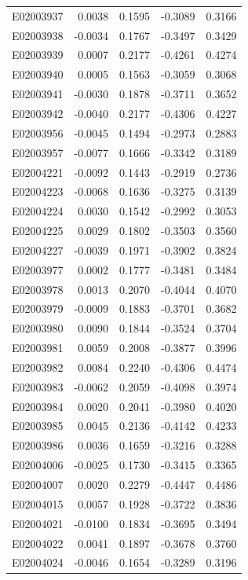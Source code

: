 \documentclass[11pt, a4paper]{article}
\begin{document}
\begin{longtable}{lrrrr}
E02003937 & 0.0038 & 0.1595 & -0.3089 & 0.3166 \\
E02003938 & -0.0034 & 0.1767 & -0.3497 & 0.3429 \\
E02003939 & 0.0007 & 0.2177 & -0.4261 & 0.4274 \\
E02003940 & 0.0005 & 0.1563 & -0.3059 & 0.3068 \\
E02003941 & -0.0030 & 0.1878 & -0.3711 & 0.3652 \\
E02003942 & -0.0040 & 0.2177 & -0.4306 & 0.4227 \\
E02003956 & -0.0045 & 0.1494 & -0.2973 & 0.2883 \\
E02003957 & -0.0077 & 0.1666 & -0.3342 & 0.3189 \\
E02004221 & -0.0092 & 0.1443 & -0.2919 & 0.2736 \\
E02004223 & -0.0068 & 0.1636 & -0.3275 & 0.3139 \\
E02004224 & 0.0030 & 0.1542 & -0.2992 & 0.3053 \\
E02004225 & 0.0029 & 0.1802 & -0.3503 & 0.3560 \\
E02004227 & -0.0039 & 0.1971 & -0.3902 & 0.3824 \\
E02003977 & 0.0002 & 0.1777 & -0.3481 & 0.3484 \\
E02003978 & 0.0013 & 0.2070 & -0.4044 & 0.4070 \\
E02003979 & -0.0009 & 0.1883 & -0.3701 & 0.3682 \\
E02003980 & 0.0090 & 0.1844 & -0.3524 & 0.3704 \\
E02003981 & 0.0059 & 0.2008 & -0.3877 & 0.3996 \\
E02003982 & 0.0084 & 0.2240 & -0.4306 & 0.4474 \\
E02003983 & -0.0062 & 0.2059 & -0.4098 & 0.3974 \\
E02003984 & 0.0020 & 0.2041 & -0.3980 & 0.4020 \\
E02003985 & 0.0045 & 0.2136 & -0.4142 & 0.4233 \\
E02003986 & 0.0036 & 0.1659 & -0.3216 & 0.3288 \\
E02004006 & -0.0025 & 0.1730 & -0.3415 & 0.3365 \\
E02004007 & 0.0020 & 0.2279 & -0.4447 & 0.4486 \\
E02004015 & 0.0057 & 0.1928 & -0.3722 & 0.3836 \\
E02004021 & -0.0100 & 0.1834 & -0.3695 & 0.3494 \\
E02004022 & 0.0041 & 0.1897 & -0.3678 & 0.3760 \\
E02004024 & -0.0046 & 0.1654 & -0.3289 & 0.3196 \\

\end{longtable}
\end{document}
